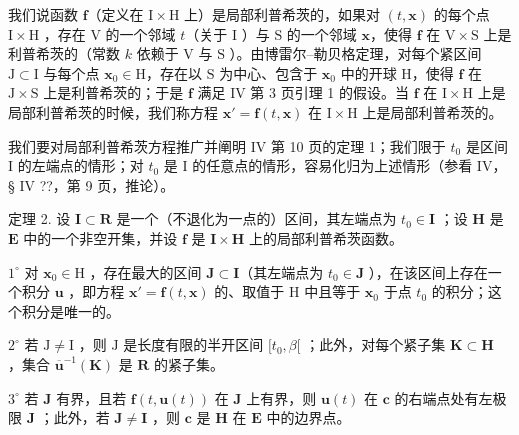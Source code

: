 我们说函数 \(\mathbf{f}\)（定义在 \(\mathrm{I} \times \mathrm{H}\) 上）是局部利普希茨的，如果对 \((t, \mathbf{x})\) 的每个点 \(\mathrm{I} \times \mathrm{H}\) ，存在 \(\mathrm{V}\) 的一个邻域 \(t\)（关于 \(\mathrm{I}\) ）与 \(\mathrm{S}\) 的一个邻域 \(\mathbf{x}\)，使得 \(\mathbf{f}\) 在 \(\mathrm{V} \times \mathrm{S}\) 上是利普希茨的（常数 \(k\) 依赖于 \(\mathrm{V}\) 与 \(\mathrm{S}\) ）。由博雷尔–勒贝格定理，对每个紧区间 \(\mathrm{J} \subset \mathrm{I}\) 与每个点 \(\mathbf{x}_0 \in \mathrm{H}\)，存在以 \(\mathrm{S}\) 为中心、包含于 \(\mathbf{x}_0\) 中的开球 \(\mathrm{H}\)，使得 \(\mathbf{f}\) 在 \(\mathrm{J} \times \mathrm{S}\) 上是利普希茨的；于是 \(\mathbf{f}\) 满足 IV 第 3 页引理 1 的假设。当 \(\mathbf{f}\) 在 \(\mathrm{I} \times \mathrm{H}\) 上是局部利普希茨的时候，我们称方程 \(\mathbf{x}' = \mathbf{f}(t, \mathbf{x})\) 在 \(\mathrm{I} \times \mathrm{H}\) 上是局部利普希茨的。

我们要对局部利普希茨方程推广并阐明 IV 第 10 页的定理 1；我们限于 \(t_0\) 是区间 I 的左端点的情形；对 \(t_0\) 是 I 的任意点的情形，容易化归为上述情形（参看 IV，§ IV ??，第 9 页，推论）。

定理 2. 设 \(\mathbf{I} \subset \mathbf{R}\) 是一个（不退化为一点的）区间，其左端点为 \(t_0 \in \mathbf{I}\) ；设 \(\mathbf{H}\) 是 \(\mathbf{E}\) 中的一个非空开集，并设 \(\mathbf{f}\) 是 \(\mathbf{I} \times \mathbf{H}\) 上的局部利普希茨函数。

\(1^{\circ}\) 对 \(\mathbf{x}_0\in \mathrm{H}\) ，存在最大的区间 \(\mathbf{J}\subset \mathbf{I}\)（其左端点为 \(t_0\in \mathbf{J}\) ），在该区间上存在一个积分 \(\mathbf{u}\) ，即方程 \(\mathbf{x}' = \mathbf{f}(t,\mathbf{x})\) 的、取值于 H 中且等于 \(\mathbf{x}_0\) 于点 \(t_0\) 的积分；这个积分是唯一的。

\(2^{\circ}\) 若 \(\mathrm{J} \neq \mathrm{I}\) ，则 \(\mathrm{J}\) 是长度有限的半开区间 \([t_0, \beta[\) ；此外，对每个紧子集 \(\mathbf{K} \subset \mathbf{H}\) ，集合 \(\overline{\mathbf{u}}^{-1}(\mathbf{K})\) 是 \(\mathbf{R}\) 的紧子集。

\(3^{\circ}\) 若 \(\mathbf{J}\) 有界，且若 \(\mathbf{f}(t,\mathbf{u}(t))\) 在 \(\mathbf{J}\) 上有界，则 \(\mathbf{u}(t)\) 在 \(\mathbf{c}\) 的右端点处有左极限 \(\mathbf{J}\) ；此外，若 \(\mathbf{J} \neq \mathbf{I}\) ，则 \(\mathbf{c}\) 是 \(\mathbf{H}\) 在 \(\mathbf{E}\) 中的边界点。

